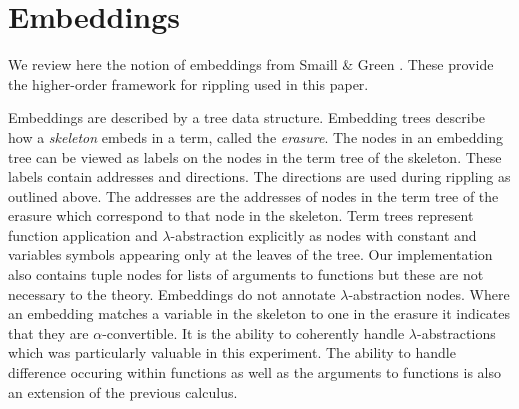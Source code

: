 \section{Embeddings}
\label{embeddings}
We review here the notion of embeddings from Smaill \&
Green \cite{pub799}.  These provide the higher-order framework for
rippling used in this paper.

Embeddings are described by a tree data structure.  Embedding trees
describe how a \emph{skeleton} embeds in a term, called
the \emph{erasure}.  The nodes in an embedding tree
can be viewed as labels on the nodes in the term tree of the skeleton.
These labels contain addresses and directions.  The directions are
used during rippling as outlined above.  The addresses
are the addresses of nodes in the term tree of the erasure which
correspond to that node in the skeleton.  Term trees represent
function application and $\lambda$-abstraction explicitly as nodes with
constant and variables symbols appearing only at the leaves of the
tree.  Our implementation also contains tuple nodes for lists of
arguments to functions but these are not necessary to the theory.
Embeddings do not annotate $\lambda$-abstraction nodes.  Where an
embedding matches a variable in the skeleton to one in the erasure it
indicates that they are $\alpha$-convertible.
It is the ability to coherently handle
$\lambda$-abstractions which was particularly valuable in this
experiment.  The ability to handle difference occuring within functions as well
as the arguments to functions is also an extension of the previous
calculus.

